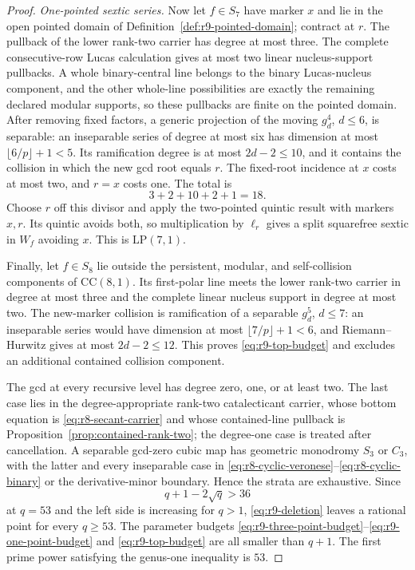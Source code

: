 \begin{proof}
\emph{One-pointed sextic series.}
Now let $f\in S_7$ have marker $x$ and lie in the open pointed domain
of Definition~\ref{def:r9-pointed-domain}; contract at $r$.  The
pullback of the lower rank-two carrier has degree at most three.  The
complete consecutive-row Lucas calculation gives at most two linear
nucleus-support pullbacks.  A whole binary-central line belongs to the
binary Lucas-nucleus component, and the other whole-line possibilities
are exactly the remaining declared modular supports, so these
pullbacks are finite on the pointed domain.  After removing fixed
factors, a generic
projection of the moving $g^4_d$, $d\leq6$, is separable: an
inseparable series of degree at most six has dimension at most
$\lfloor6/p\rfloor+1<5$.  Its ramification degree is at most
$2d-2\leq10$, and it contains the collision in which the new gcd root
equals $r$.  The fixed-root incidence at $x$ costs at most two, and
$r=x$ costs one.  The total is
\begin{equation}\label{eq:r9-one-point-budget}
             3+2+10+2+1=18.
\end{equation}
Choose $r$ off this divisor and apply the two-pointed quintic result
with markers $x,r$.  Its quintic avoids both, so multiplication by
$\ell_r$ gives a split squarefree sextic in $W_f$ avoiding $x$.
This is $\mathrm{LP}(7,1)$.

Finally, let $f\in S_8$ lie outside the persistent, modular, and
self-collision components of $\mathrm{CC}(8,1)$.  Its first-polar line
meets the lower
rank-two carrier in degree at most three and the complete linear
nucleus support in degree at most two.  The new-marker collision is
ramification of a separable $g^5_d$, $d\leq7$: an inseparable series
would have dimension at most $\lfloor7/p\rfloor+1<6$, and
Riemann--Hurwitz gives at most $2d-2\leq12$.  This proves
\eqref{eq:r9-top-budget} and
excludes an additional contained collision component.

The gcd at every recursive level has degree zero, one, or at least
two.  The last case lies in the degree-appropriate rank-two
catalecticant carrier, whose bottom equation is
\eqref{eq:r8-secant-carrier} and whose
contained-line pullback is
Proposition~\ref{prop:contained-rank-two}; the degree-one case is
treated after cancellation.  A separable gcd-zero cubic map has geometric
monodromy $S_3$ or $C_3$, with the latter and every inseparable case
in \eqref{eq:r8-cyclic-veronese}--\eqref{eq:r8-cyclic-binary} or the
derivative-minor boundary.  Hence the strata are
exhaustive.  Since
\[
             q+1-2\sqrt q>36
\]
at $q=53$ and the left side is increasing for $q>1$,
\eqref{eq:r9-deletion} leaves a
rational point for every $q\geq53$.  The parameter budgets
\eqref{eq:r9-three-point-budget}--\eqref{eq:r9-one-point-budget} and
\eqref{eq:r9-top-budget} are all smaller than $q+1$.  The first prime
power satisfying the genus-one inequality is $53$.
\end{proof}

